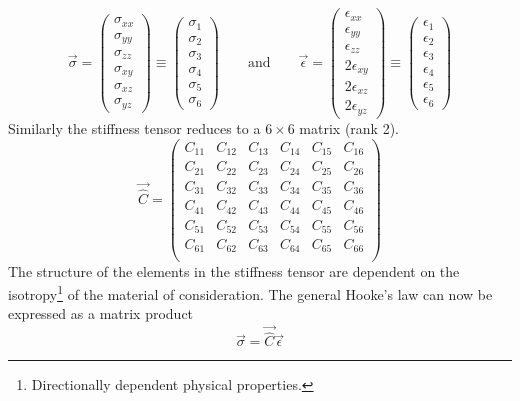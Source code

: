 \documentclass[twoside,english]{uiofysmaster}
\begin{document}
\begin{equation}
\vec{\sigma} = 
\begin{pmatrix}
\sigma_{xx} \\
\sigma_{yy} \\
\sigma_{zz} \\
\sigma_{xy} \\ 
\sigma_{xz} \\
\sigma_{yz}
\end{pmatrix}
\equiv
\begin{pmatrix}
\sigma_{1} \\
\sigma_{2} \\
\sigma_{3} \\
\sigma_{4} \\ 
\sigma_{5} \\
\sigma_{6}
\end{pmatrix}
\qquad
\text{and}
\qquad
\vec{\epsilon} = 
\begin{pmatrix}
\epsilon_{xx} \\
\epsilon_{yy} \\
\epsilon_{zz} \\
2\epsilon_{xy} \\ 
2\epsilon_{xz} \\
2\epsilon_{yz}
\end{pmatrix}
\equiv
\begin{pmatrix}
\epsilon_{1} \\
\epsilon_{2} \\
\epsilon_{3} \\
\epsilon_{4} \\ 
\epsilon_{5} \\
\epsilon_{6}
\end{pmatrix}
\end{equation}
Similarly the stiffness tensor reduces to a $6\times6$ matrix (rank 2).
\begin{equation}
	\vec{\hat{C}} = \begin{pmatrix}
	C_{11}& C_{12}& C_{13}& C_{14}& C_{15}& C_{16} \\
	C_{21}& C_{22}& C_{23}& C_{24}& C_{25}& C_{26} \\
	C_{31}& C_{32}& C_{33}& C_{34}& C_{35}& C_{36} \\
	C_{41}& C_{42}& C_{43}& C_{44}& C_{45}& C_{46} \\
	C_{51}& C_{52}& C_{53}& C_{54}& C_{55}& C_{56} \\
	C_{61}& C_{62}& C_{63}& C_{64}& C_{65}& C_{66} \\
	\end{pmatrix}
\end{equation} 
The structure of the elements in the stiffness tensor are dependent on the isotropy\footnote{Directionally dependent physical properties.} of the material of consideration.
The general Hooke's law can now be expressed as a matrix product
\begin{equation}
	\vec{\sigma} = \vec{\hat{C}}\vec{\epsilon}
\end{equation}
\end{document}
